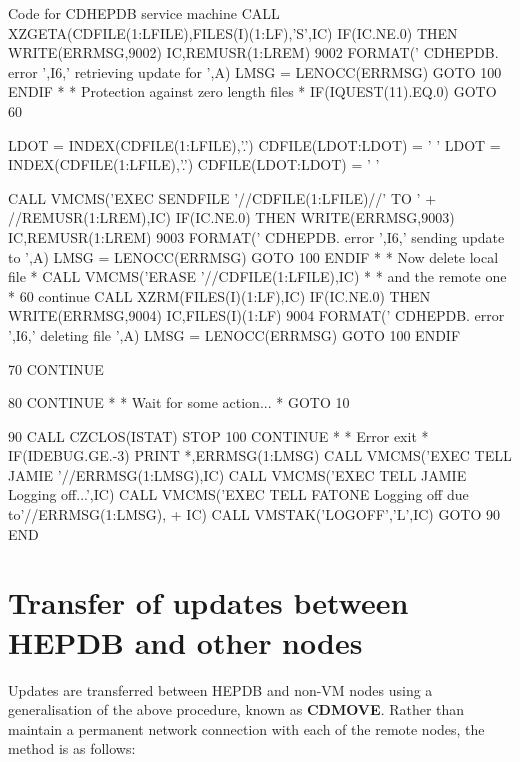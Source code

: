 \begin{XMPt}{Code for CDHEPDB service machine}
            CALL XZGETA(CDFILE(1:LFILE),FILES(I)(1:LF),'S',IC)
            IF(IC.NE.0) THEN
               WRITE(ERRMSG,9002) IC,REMUSR(1:LREM)
 9002    FORMAT(' CDHEPDB. error ',I6,' retrieving update for ',A)
               LMSG = LENOCC(ERRMSG)
               GOTO 100
            ENDIF
*
*      Protection against zero length files
*
            IF(IQUEST(11).EQ.0) GOTO 60
 
            LDOT = INDEX(CDFILE(1:LFILE),'.')
            CDFILE(LDOT:LDOT) = ' '
            LDOT = INDEX(CDFILE(1:LFILE),'.')
            CDFILE(LDOT:LDOT) = ' '
 
            CALL VMCMS('EXEC SENDFILE '//CDFILE(1:LFILE)//' TO '
     +                 //REMUSR(1:LREM),IC)
            IF(IC.NE.0) THEN
               WRITE(ERRMSG,9003) IC,REMUSR(1:LREM)
 9003    FORMAT(' CDHEPDB. error ',I6,' sending update to ',A)
               LMSG = LENOCC(ERRMSG)
               GOTO 100
            ENDIF
*
*     Now delete local file
*
            CALL VMCMS('ERASE '//CDFILE(1:LFILE),IC)
*
*     and the remote one
*
   60       continue
            CALL XZRM(FILES(I)(1:LF),IC)
            IF(IC.NE.0) THEN
               WRITE(ERRMSG,9004) IC,FILES(I)(1:LF)
 9004    FORMAT(' CDHEPDB. error ',I6,' deleting file ',A)
               LMSG = LENOCC(ERRMSG)
               GOTO 100
            ENDIF
 
   70    CONTINUE
 
   80 CONTINUE
*
*     Wait for some action...
*
      GOTO 10
 
   90 CALL CZCLOS(ISTAT)
      STOP
  100 CONTINUE
*
*     Error exit
*
      IF(IDEBUG.GE.-3) PRINT *,ERRMSG(1:LMSG)
      CALL VMCMS('EXEC TELL JAMIE '//ERRMSG(1:LMSG),IC)
      CALL VMCMS('EXEC TELL JAMIE Logging off...',IC)
      CALL VMCMS('EXEC TELL FATONE Logging off due to'//ERRMSG(1:LMSG),
     +           IC)
      CALL VMSTAK('LOGOFF','L',IC)
      GOTO 90
      END
\end{XMPt}

\section{Transfer of updates between HEPDB and other nodes}

\label{sect-CDMOVE}
Updates are transferred between HEPDB and non-VM nodes using
a generalisation of the above procedure, known as {\bf CDMOVE}. 
Rather than maintain
a permanent network connection with each of the remote nodes,
the method is as follows:

